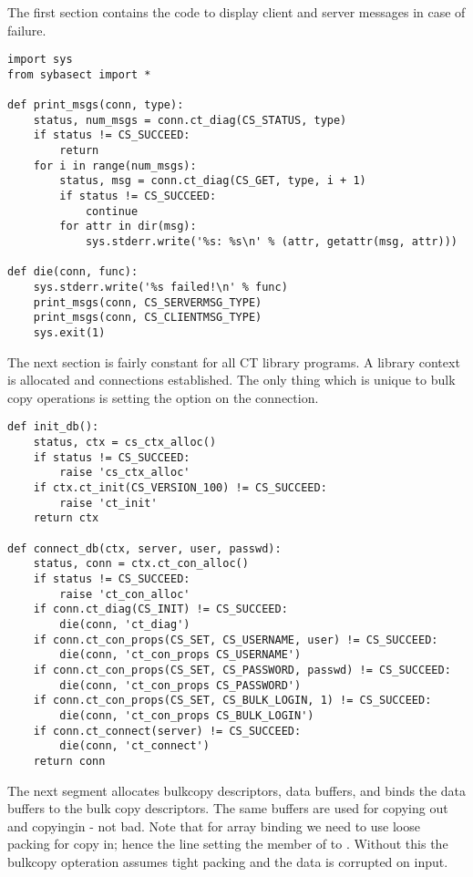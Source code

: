 The first section contains the code to display client and server
messages in case of failure.

\begin{verbatim}
import sys
from sybasect import *

def print_msgs(conn, type):
    status, num_msgs = conn.ct_diag(CS_STATUS, type)
    if status != CS_SUCCEED:
        return
    for i in range(num_msgs):
        status, msg = conn.ct_diag(CS_GET, type, i + 1)
        if status != CS_SUCCEED:
            continue
        for attr in dir(msg):
            sys.stderr.write('%s: %s\n' % (attr, getattr(msg, attr)))

def die(conn, func):
    sys.stderr.write('%s failed!\n' % func)
    print_msgs(conn, CS_SERVERMSG_TYPE)
    print_msgs(conn, CS_CLIENTMSG_TYPE)
    sys.exit(1)
\end{verbatim}

The next section is fairly constant for all CT library programs.  A
library context is allocated and connections established.  The only
thing which is unique to bulk copy operations is setting the
 option on the connection.

\begin{verbatim}
def init_db():
    status, ctx = cs_ctx_alloc()
    if status != CS_SUCCEED:
        raise 'cs_ctx_alloc'
    if ctx.ct_init(CS_VERSION_100) != CS_SUCCEED:
        raise 'ct_init'
    return ctx

def connect_db(ctx, server, user, passwd):
    status, conn = ctx.ct_con_alloc()
    if status != CS_SUCCEED:
        raise 'ct_con_alloc'
    if conn.ct_diag(CS_INIT) != CS_SUCCEED:
        die(conn, 'ct_diag')
    if conn.ct_con_props(CS_SET, CS_USERNAME, user) != CS_SUCCEED:
        die(conn, 'ct_con_props CS_USERNAME')
    if conn.ct_con_props(CS_SET, CS_PASSWORD, passwd) != CS_SUCCEED:
        die(conn, 'ct_con_props CS_PASSWORD')
    if conn.ct_con_props(CS_SET, CS_BULK_LOGIN, 1) != CS_SUCCEED:
        die(conn, 'ct_con_props CS_BULK_LOGIN')
    if conn.ct_connect(server) != CS_SUCCEED:
        die(conn, 'ct_connect')
    return conn
\end{verbatim}

The next segment allocates bulkcopy descriptors, data buffers, and
binds the data buffers to the bulk copy descriptors.  The same buffers
are used for copying out and copyingin - not bad.  Note that for array
binding we need to use loose packing for copy in; hence the line
setting the  member of   to
.  Without this the bulkcopy opteration
assumes tight packing and the data is corrupted on input.

